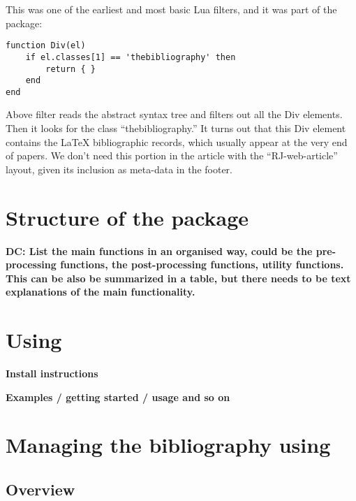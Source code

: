 This was one of the earliest and most basic Lua filters, and it was part of the  package:

\begin{verbatim}
function Div(el)
    if el.classes[1] == 'thebibliography' then
        return { }
    end
end
\end{verbatim}

Above filter reads the abstract syntax tree and filters out all the Div elements. Then it looks for the class ``thebibliography.'' It turns out that this Div element contains the LaTeX bibliographic records, which usually appear at the very end
of papers. We don't need this portion in the article with the ``RJ-web-article'' layout, given its inclusion as meta-data in the footer.

\hypertarget{structure-of-the-package}{%
\section{\texorpdfstring{Structure of the  package}{Structure of the  package}}\label{structure-of-the-package}}

\textbf{DC: List the main functions in an organised way, could be the pre-processing functions, the post-processing functions, utility functions. This can be also be summarized in a table, but there needs to be text explanations of the main functionality.}

\hypertarget{using}{%
\section{\texorpdfstring{Using }{Using }}\label{using}}

\textbf{Install instructions}

\textbf{Examples / getting started / usage and so on}

\hypertarget{managing-the-bibliography-using}{%
\section{\texorpdfstring{Managing the bibliography using }{Managing the bibliography using }}\label{managing-the-bibliography-using}}

\hypertarget{overview}{%
\subsection{Overview}\label{overview}}

